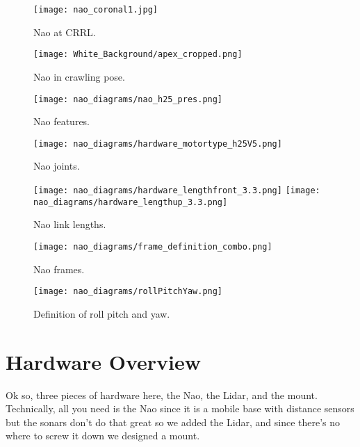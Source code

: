 \begin{figure}
  \centering
  \texttt{[image: nao\_coronal1.jpg]}
  \caption{Nao at CRRL.}
  \label{fig:crrl_nao_coronal1}
\end{figure}

\begin{figure}
  \centering
  \texttt{[image: White\_Background/apex\_cropped.png]}
  \caption{Nao in crawling pose.}
  \label{fig:crrl_nao_apex1}
\end{figure}

\begin{figure}
  \centering
  \texttt{[image: nao\_diagrams/nao\_h25\_pres.png]}
  \caption{Nao features.}
  \label{fig:nao_features1}
\end{figure}

\begin{figure}
  \centering
  \texttt{[image: nao\_diagrams/hardware\_motortype\_h25V5.png]}
  \caption{Nao joints.}
  \label{fig:nao_joints1}
\end{figure}

\begin{figure}
  \centerline{
    \texttt{[image: nao\_diagrams/hardware\_lengthfront\_3.3.png]}
    \texttt{[image: nao\_diagrams/hardware\_lengthup\_3.3.png]}
  }
  \caption{Nao link lengths.}
  \label{fig:nao_link_lengths1}
\end{figure}

\begin{figure}
  \centering
  \texttt{[image: nao\_diagrams/frame\_definition\_combo.png]}
  \caption{Nao frames.}
  \label{fig:nao_frames1}
\end{figure}

\begin{figure}
  \centerline{
    \texttt{[image: nao\_diagrams/rollPitchYaw.png]}
  }
  \caption{Definition of roll pitch and yaw.}
  \label{fig:nao_rpy_def1}
\end{figure}

\section{Hardware Overview}
Ok so, three pieces of hardware here, the Nao, the Lidar, and the mount.
Technically, all you need is the Nao since it is a mobile base with distance sensors but the sonars
don't do that great so we added the Lidar, and since there's no where to screw it down we designed a mount.

